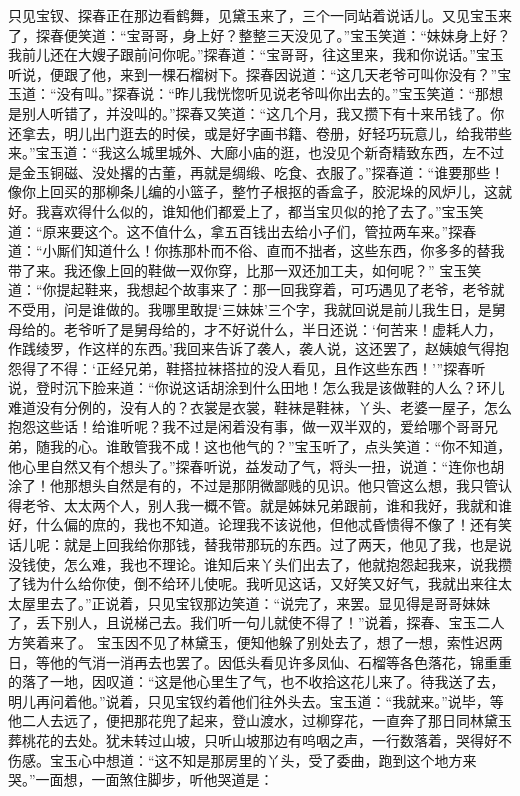 \documentclass[12pt,oneside]{book}
\begin{document}
只见宝钗、探春正在那边看鹤舞，见黛玉来了，三个一同站着说话儿。又见宝玉来了，探春便笑道：“宝哥哥，身上好？整整三天没见了。”宝玉笑道：“妹妹身上好？我前儿还在大嫂子跟前问你呢。”探春道：“宝哥哥，往这里来，我和你说话。”宝玉听说，便跟了他，来到一棵石榴树下。探春因说道：“这几天老爷可叫你没有？”宝玉道：“没有叫。”探春说：“昨儿我恍惚听见说老爷叫你出去的。”宝玉笑道：“那想是别人听错了，并没叫的。”探春又笑道：“这几个月，我又攒下有十来吊钱了。你还拿去，明儿出门逛去的时侯，或是好字画书籍、卷册，好轻巧玩意儿，给我带些来。”宝玉道：“我这么城里城外、大廊小庙的逛，也没见个新奇精致东西，左不过是金玉铜磁、没处撂的古董，再就是绸缎、吃食、衣服了。”探春道：“谁要那些！像你上回买的那柳条儿编的小篮子，整竹子根抠的香盒子，胶泥垛的风炉儿，这就好。我喜欢得什么似的，谁知他们都爱上了，都当宝贝似的抢了去了。”宝玉笑道：“原来要这个。这不值什么，拿五百钱出去给小子们，管拉两车来。”探春道：“小厮们知道什么！你拣那朴而不俗、直而不拙者，这些东西，你多多的替我带了来。我还像上回的鞋做一双你穿，比那一双还加工夫，如何呢？”
宝玉笑道：“你提起鞋来，我想起个故事来了：那一回我穿着，可巧遇见了老爷，老爷就不受用，问是谁做的。我哪里敢提‘三妹妹’三个字，我就回说是前儿我生日，是舅母给的。老爷听了是舅母给的，才不好说什么，半日还说：‘何苦来！虚耗人力，作践绫罗，作这样的东西。’我回来告诉了袭人，袭人说，这还罢了，赵姨娘气得抱怨得了不得：‘正经兄弟，鞋搭拉袜搭拉的没人看见，且作这些东西！’”探春听说，登时沉下脸来道：“你说这话胡涂到什么田地！怎么我是该做鞋的人么？环儿难道没有分例的，没有人的？衣裳是衣裳，鞋袜是鞋袜，丫头、老婆一屋子，怎么抱怨这些话！给谁听呢？我不过是闲着没有事，做一双半双的，爱给哪个哥哥兄弟，随我的心。谁敢管我不成！这也他气的？”宝玉听了，点头笑道：“你不知道，他心里自然又有个想头了。”探春听说，益发动了气，将头一扭，说道：“连你也胡涂了！他那想头自然是有的，不过是那阴微鄙贱的见识。他只管这么想，我只管认得老爷、太太两个人，别人我一概不管。就是姊妹兄弟跟前，谁和我好，我就和谁好，什么偏的庶的，我也不知道。论理我不该说他，但他忒昏愦得不像了！还有笑话儿呢：就是上回我给你那钱，替我带那玩的东西。过了两天，他见了我，也是说没钱使，怎么难，我也不理论。谁知后来丫头们出去了，他就抱怨起我来，说我攒了钱为什么给你使，倒不给环儿使呢。我听见这话，又好笑又好气，我就出来往太太屋里去了。”正说着，只见宝钗那边笑道：“说完了，来罢。显见得是哥哥妹妹了，丢下别人，且说梯己去。我们听一句儿就使不得了！”说着，探春、宝玉二人方笑着来了。
宝玉因不见了林黛玉，便知他躲了别处去了，想了一想，索性迟两日，等他的气消一消再去也罢了。因低头看见许多凤仙、石榴等各色落花，锦重重的落了一地，因叹道：“这是他心里生了气，也不收拾这花儿来了。待我送了去，明儿再问着他。”说着，只见宝钗约着他们往外头去。宝玉道：“我就来。”说毕，等他二人去远了，便把那花兜了起来，登山渡水，过柳穿花，一直奔了那日同林黛玉葬桃花的去处。犹未转过山坡，只听山坡那边有呜咽之声，一行数落着，哭得好不伤感。宝玉心中想道：“这不知是那房里的丫头，受了委曲，跑到这个地方来哭。”一面想，一面煞住脚步，听他哭道是：
\end{document}
